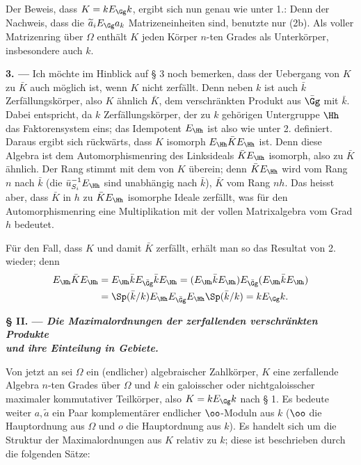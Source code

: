 Der Beweis, dass $K=kE_\Gg k$, ergibt sich nun genau wie unter 1.: Denn der Nachweis, dass die $\widetilde a_iE_\Gg a_k$ Matrizeneinheiten sind, benutzte nur (2b). Als voller Matrizenring über $\Omega$ enthält $K$ jeden Körper $n$-ten Grades als Unterkörper, insbesondere auch $k$.

\medskip
\noindent\textbf{3. ---} Ich möchte im Hinblick auf § 3 noch bemerken, dass der Uebergang von $K$ zu $\bar K$ auch möglich ist, wenn $K$ nicht zerfällt. Denn neben $k$ ist auch $\bar k$ Zerfällungskörper, also $K$ ähnlich $\bar K$, dem verschränkten Produkt aus $\bar\Gg$ mit $\bar k$. Dabei entspricht, da $k$ Zerfällungskörper, der zu $k$ gehörigen Untergruppe $\Hh$ das Faktorensystem eins; das Idempotent $E_\Hh$ ist also wie unter 2. definiert. Daraus ergibt sich rückwärts, dass $K$ isomorph $E_\Hh\bar K E_\Hh$ ist. Denn diese Algebra ist dem Automorphismenring des Linksideals $\bar K E_\Hh$ isomorph, also zu $\bar K$ ähnlich. Der Rang stimmt mit dem von $K$ überein; denn $\bar K E_\Hh$ wird vom Rang $n$ nach $\bar k$ (die $\bar u_{S_i}^{-1}E_\Hh$ sind unabhängig nach $\bar k$), $\bar K$ vom Rang $nh$. Das heisst aber, dass $\bar K$ in $h$ zu $\bar K E_\Hh$ isomorphe Ideale zerfällt, was für den Automorphismenring eine Multiplikation mit der vollen Matrixalgebra vom Grad $h$ bedeutet.

Für den Fall, dass $K$ und damit $\bar K$ zerfällt, erhält man so das Resultat von 2. wieder; denn
\[
\begin{aligned}
E_\Hh\bar K E_\Hh
 &=E_\Hh\bar kE_{\bar\Gg}\bar kE_\Hh
 =(E_\Hh\bar kE_\Hh)E_{\bar\Gg}(E_\Hh\bar kE_\Hh)\\
 &=\Sp(\bar k/k)E_\Hh E_{\bar\Gg}E_\Hh\Sp(\bar k/k)
 =kE_\Gg k.
\end{aligned}
\]

\begin{center}
\textbf{§ II. --- \emph{Die Maximalordnungen der zerfallenden verschränkten Produkte\\
und ihre Einteilung in Gebiete.}}
\end{center}

Von jetzt an sei $\Omega$ ein (endlicher) algebraischer Zahlkörper, $K$ eine zerfallende Algebra $n$-ten Grades über $\Omega$ und $k$ ein galoisscher oder nichtgaloisscher maximaler kommutativer Teilkörper, also $K=kE_\Gg k$ nach § 1. Es bedeute weiter $a,\widetilde a$ ein Paar komplementärer endlicher $\oo$-Moduln aus $k$ ($\oo$ die Hauptordnung aus $\Omega$ und $o$ die Hauptordnung aus $k$). Es handelt sich um die Struktur der Maximalordnungen aus $K$ relativ zu $k$; diese ist beschrieben durch die folgenden Sätze:

